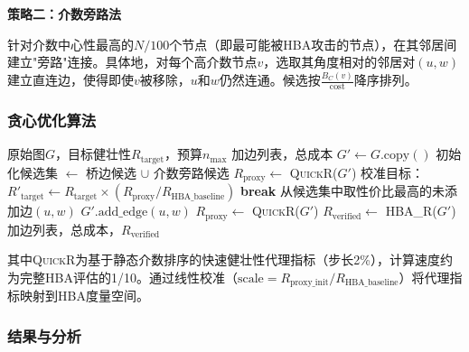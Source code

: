 \documentclass[12pt,a4paper]{article}
\begin{document}
\textbf{策略二：介数旁路法}

针对介数中心性最高的$N/100$个节点（即最可能被HBA攻击的节点），在其邻居间建立"旁路"连接。具体地，对每个高介数节点$v$，选取其角度相对的邻居对$(u, w)$建立直连边，使得即使$v$被移除，$u$和$w$仍然连通。候选按$\frac{B_C(v)}{\text{cost}}$降序排列。

\subsubsection{贪心优化算法}

\begin{algorithm}[H]
\caption{贪心加边优化算法}
\begin{algorithmic}[1]
\REQUIRE 原始图$G$，目标健壮性$R_{\text{target}}$，预算$n_{\max}$
\ENSURE 加边列表，总成本
\STATE $G' \leftarrow G.\text{copy}()$
\STATE 初始化候选集 $\leftarrow$ 桥边候选 $\cup$ 介数旁路候选
\STATE $R_{\text{proxy}} \leftarrow$ \textsc{QuickR}($G'$) 
\STATE 校准目标：$R'_{\text{target}} \leftarrow R_{\text{target}} \times (R_{\text{proxy}} / R_{\text{HBA\_baseline}})$
        \STATE \textbf{break}
    \ENDIF
    \STATE 从候选集中取性价比最高的未添加边$(u, w)$
    \STATE $G'.\text{add\_edge}(u, w)$
        \STATE $R_{\text{proxy}} \leftarrow$ \textsc{QuickR}($G'$)
    \ENDIF
\ENDFOR
\STATE $R_{\text{verified}} \leftarrow$ \textsc{HBA\_R}($G'$) 
\RETURN 加边列表，总成本，$R_{\text{verified}}$
\end{algorithmic}
\end{algorithm}

其中\textsc{QuickR}为基于静态介数排序的快速健壮性代理指标（步长2\%），计算速度约为完整HBA评估的1/10。通过线性校准（$\text{scale} = R_{\text{proxy\_init}} / R_{\text{HBA\_baseline}}$）将代理指标映射到HBA度量空间。

\subsubsection{结果与分析}
\end{document}
